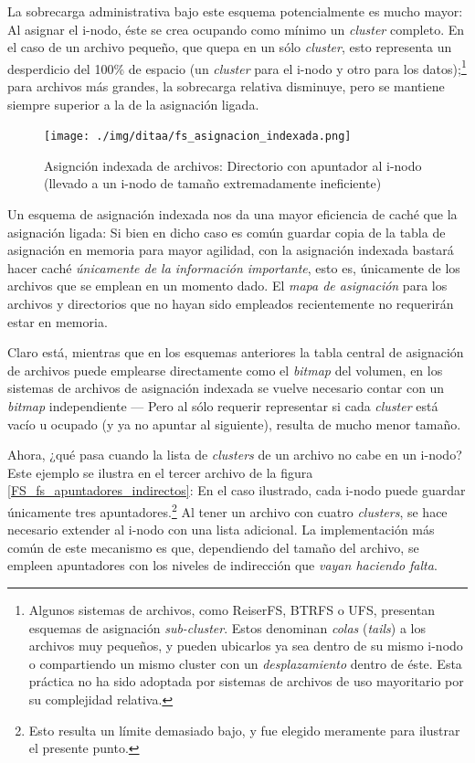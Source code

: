 \documentclass[11pt,fleqn]{book} %
\begin{document}
La sobrecarga administrativa bajo este esquema potencialmente es mucho
mayor: Al asignar el i-nodo, éste se crea ocupando como mínimo un
\emph{cluster} completo. En el caso de un archivo pequeño, que quepa en un
sólo \emph{cluster}, esto representa un desperdicio del 100\% de espacio (un
\emph{cluster} para el i-nodo y otro para los datos);\footnote{Algunos sistemas
de archivos, como ReiserFS, BTRFS o UFS, presentan esquemas de
asignación \emph{sub-cluster}. Estos denominan \emph{colas} (\emph{tails}) a los
archivos muy pequeños, y pueden ubicarlos ya sea dentro de su mismo
i-nodo o compartiendo un mismo cluster con un \emph{desplazamiento} dentro
de éste. Esta práctica no ha sido adoptada por sistemas de archivos de
uso mayoritario por su complejidad relativa. } para archivos más
grandes, la sobrecarga relativa disminuye, pero se mantiene siempre
superior a la de la asignación ligada.

\begin{figure}[htb]
\centering
\texttt{[image: ./img/ditaa/fs\_asignacion\_indexada.png]}
\caption{\label{FS_fs_asignacion_indexada}Asignción indexada de archivos: Directorio con apuntador al i-nodo (llevado a un i-nodo de tamaño extremadamente ineficiente)}
\end{figure}

Un esquema de asignación indexada nos da una mayor eficiencia de caché
que la asignación ligada: Si bien en dicho caso es común guardar copia
de la tabla de asignación en memoria para mayor agilidad, con la
asignación indexada bastará hacer caché \emph{únicamente de la información importante}, esto es, únicamente de los archivos que se emplean en un
momento dado. El \emph{mapa de asignación} para los archivos y directorios
que no hayan sido empleados recientemente no requerirán estar en
memoria.

Claro está, mientras que en los esquemas anteriores la tabla central
de asignación de archivos puede emplearse directamente como el
\emph{bitmap} del volumen, en los sistemas de archivos de asignación
indexada se vuelve necesario contar con un \emph{bitmap} independiente —
Pero al sólo requerir representar si cada \emph{cluster} está vacío u
ocupado (y ya no apuntar al siguiente), resulta de mucho menor tamaño.

Ahora, ¿qué pasa cuando la lista de \emph{clusters} de un archivo no cabe
en un i-nodo? Este ejemplo se ilustra en el tercer archivo de la
figura \ref{FS_fs_apuntadores_indirectos}: En el caso ilustrado, cada
i-nodo puede guardar únicamente tres apuntadores.\footnote{Esto resulta un
límite demasiado bajo, y fue elegido meramente para ilustrar el
presente punto. } Al tener un archivo con cuatro \emph{clusters}, se hace
necesario extender al i-nodo con una lista adicional. La
implementación más común de este mecanismo es que, dependiendo del
tamaño del archivo, se empleen apuntadores con los niveles de
indirección que \emph{vayan haciendo falta}.
\end{document}
